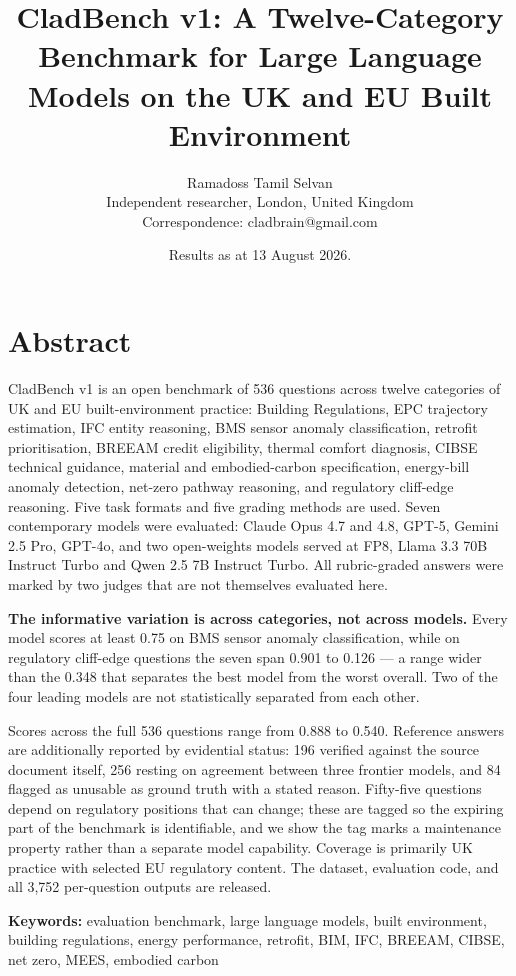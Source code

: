\documentclass[11pt,a4paper]{article}
\title{CladBench v1: A Twelve-Category Benchmark for Large Language Models on the UK and EU Built Environment}
\author{Ramadoss Tamil Selvan \\[2pt] \small Independent researcher, London, United Kingdom \\ Correspondence: cladbrain@gmail.com}
\date{Results as at 13 August 2026.}
\begin{document}
\maketitle

\section*{Abstract}

CladBench v1 is an open benchmark of 536 questions across twelve categories of UK and EU built-environment practice: Building Regulations, EPC trajectory estimation, IFC entity reasoning, BMS sensor anomaly classification, retrofit prioritisation, BREEAM credit eligibility, thermal comfort diagnosis, CIBSE technical guidance, material and embodied-carbon specification, energy-bill anomaly detection, net-zero pathway reasoning, and regulatory cliff-edge reasoning. Five task formats and five grading methods are used. Seven contemporary models were evaluated: Claude Opus 4.7 and 4.8, GPT-5, Gemini 2.5 Pro, GPT-4o, and two open-weights models served at FP8, Llama 3.3 70B Instruct Turbo and Qwen 2.5 7B Instruct Turbo. All rubric-graded answers were marked by two judges that are not themselves evaluated here.

\textbf{The informative variation is across categories, not across models.} Every model scores at least 0.75 on BMS sensor anomaly classification, while on regulatory cliff-edge questions the seven span 0.901 to 0.126 --- a range wider than the 0.348 that separates the best model from the worst overall. Two of the four leading models are not statistically separated from each other.

Scores across the full 536 questions range from 0.888 to 0.540. Reference answers are additionally reported by evidential status: 196 verified against the source document itself, 256 resting on agreement between three frontier models, and 84 flagged as unusable as ground truth with a stated reason. Fifty-five questions depend on regulatory positions that can change; these are tagged so the expiring part of the benchmark is identifiable, and we show the tag marks a maintenance property rather than a separate model capability. Coverage is primarily UK practice with selected EU regulatory content. The dataset, evaluation code, and all 3,752 per-question outputs are released.

\textbf{Keywords:} evaluation benchmark, large language models, built environment, building regulations, energy performance, retrofit, BIM, IFC, BREEAM, CIBSE, net zero, MEES, embodied carbon
\end{document}

